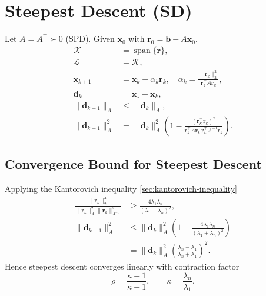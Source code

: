 \section{Steepest Descent (SD)}
Let $A = A^{\top} \succ 0$ (SPD).
Given $\mathbf{x}_0$ with $\mathbf{r}_0 = \mathbf{b} - A\mathbf{x}_0$.
\begin{align*}
  \mathcal{K}              & = \operatorname{span}\{\mathbf{r}\},                                                                                                                              \\
  \mathcal{L}              & = \mathcal{K},                                                                                                                                                    \\
  \mathbf{x}_{k+1}         & = \mathbf{x}_k + \alpha_k \mathbf{r}_k,
  \quad \alpha_k = \frac{\|\mathbf{r}_k\|_2^2}{\mathbf{r}_k^{\top} A \mathbf{r}_k},                                                                                                            \\
  \mathbf{d}_k             & = \mathbf{x}_{\star} - \mathbf{x}_k,                                                                                                                              \\
  \|\mathbf{d}_{k+1}\|_A   & \leq \|\mathbf{d}_k\|_A,                                                                                                                                          \\
  \|\mathbf{d}_{k+1}\|_A^2 & = \|\mathbf{d}_k\|_A^2\left(1 - \frac{(\mathbf{r}_k^{\top} \mathbf{r}_k)^2}{\mathbf{r}_k^{\top} A \mathbf{r}_k \,\mathbf{r}_k^{\top} A^{-1} \mathbf{r}_k}\right).
\end{align*}

\subsection{Convergence Bound for Steepest Descent}
Applying the Kantorovich inequality \autoref{sec:kantorovich-inequality}
\begin{align*}
  \frac{\|\mathbf{r}_k\|_2^4}{\|\mathbf{r}_k\|_A^2 \|\mathbf{r}_k\|_{A^{-1}}^2}
   & \geq \frac{4 \lambda_1 \lambda_n}{(\lambda_1 + \lambda_n)^2},                                     \\
  \|\mathbf{d}_{k+1}\|_A^2
   & \leq \|\mathbf{d}_k\|_A^2\left(1 - \frac{4 \lambda_1 \lambda_n}{(\lambda_1 + \lambda_n)^2}\right) \\
   & = \|\mathbf{d}_k\|_A^2\left(\frac{\lambda_n - \lambda_1}{\lambda_n + \lambda_1}\right)^2.
\end{align*}
Hence steepest descent converges linearly with contraction factor
\[
  \rho = \frac{\kappa - 1}{\kappa + 1}, \qquad \kappa = \frac{\lambda_n}{\lambda_1}.
\]

